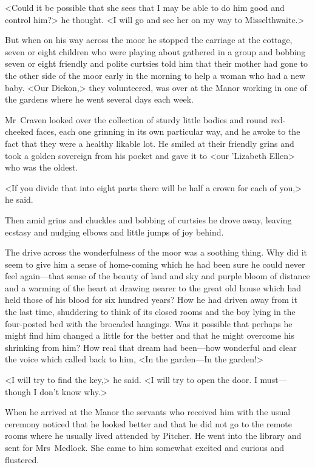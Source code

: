 <Could it be possible that she sees that I may be able to do him good and control him?> he thought. <I will go and see her on my way to Misselthwaite.>

But when on his way across the moor he stopped the carriage at the cottage, seven or eight children who were playing about gathered in a group and bobbing seven or eight friendly and polite curtsies told him that their mother had gone to the other side of the moor early in the morning to help a woman who had a new baby. <Our Dickon,> they volunteered, was over at the Manor working in one of the gardens where he went several days each week.

Mr~Craven looked over the collection of sturdy little bodies and round red-cheeked faces, each one grinning in its own particular way, and he awoke to the fact that they were a healthy likable lot. He smiled at their friendly grins and took a golden sovereign from his pocket and gave it to <our 'Lizabeth Ellen> who was the oldest.

<If you divide that into eight parts there will be half a crown for each of you,> he said.

Then amid grins and chuckles and bobbing of curtsies he drove away, leaving ecstasy and nudging elbows and little jumps of joy behind.

The drive across the wonderfulness of the moor was a soothing thing. Why did it seem to give him a sense of home-coming which he had been sure he could never feel again—that sense of the beauty of land and sky and purple bloom of distance and a warming of the heart at drawing nearer to the great old house which had held those of his blood for six hundred years? How he had driven away from it the last time, shuddering to think of its closed rooms and the boy lying in the four-posted bed with the brocaded hangings. Was it possible that perhaps he might find him changed a little for the better and that he might overcome his shrinking from him? How real that dream had been—how wonderful and clear the voice which called back to him, <In the garden—In the garden!>

<I will try to find the key,> he said. <I will try to open the door. I must—though I don't know why.>

When he arrived at the Manor the servants who received him with the usual ceremony noticed that he looked better and that he did not go to the remote rooms where he usually lived attended by Pitcher. He went into the library and sent for Mrs~Medlock. She came to him somewhat excited and curious and flustered.

